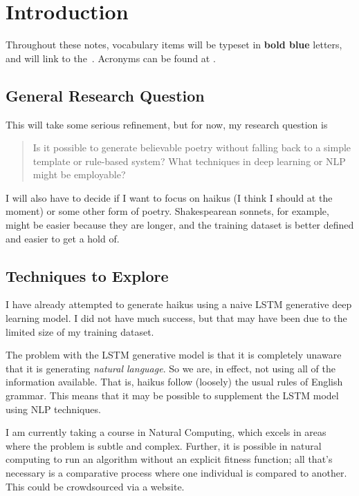 \section{Introduction}\label{sec:introduction}

Throughout these notes, vocabulary items will be typeset in
\textbf{\textcolor{__glossary_entry_color}{bold blue}} letters, and will link
to the~. Acronyms can be found at .

\subsection{General Research Question}\label{sec:research-question}

This will take some serious refinement, but for now, my research question is

\begin{quote}
    Is it possible to generate believable poetry without falling back to a simple template or
    rule-based system? What techniques in deep learning or \gls{NLP} might
    be employable?
\end{quote}

I will also have to decide if I want to focus on haikus (I think I should at the moment) or some
other form of poetry. Shakespearean sonnets, for example, might be easier because they are longer,
and the training dataset is better defined and easier to get a hold of.

\subsection{Techniques to Explore}\label{sec:techniques-to-explore}

I have already attempted to generate haikus using a naive LSTM generative
deep learning model. I did not have much success, but that may have been due to the limited size of
my training dataset.

The problem with the LSTM generative model is that it is completely unaware that it is generating
\textit{natural language}. So we are, in effect, not using all of the information available. That
is, haikus follow (loosely) the usual rules of English grammar. This means that it may be possible
to supplement the LSTM model using \gls{NLP} techniques.

I am currently taking a course in Natural Computing, which excels in areas
where the problem is subtle and complex. Further, it is possible in natural computing to run an
algorithm without an explicit fitness function; all that's necessary is a comparative process where
one individual is compared to another. This could be crowdsourced via a website.

